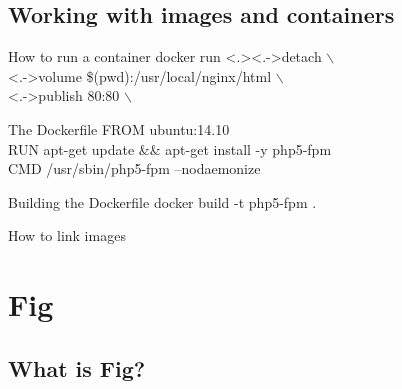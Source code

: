 \documentclass{beamer}
\begin{document}
    \subsection{Working with images and containers}
    \begin{frame}{How to run a container}
        \alert<+>{docker run}
        \alert<.>{\only<.->{\textendash\textendash detach $\backslash$\\}}
        \alert<+>{\only<.->{\textendash\textendash volume \$(pwd):/usr/local/nginx/html $\backslash$\\}}
        \alert<+>{\only<.->{\textendash\textendash publish 80:80 $\backslash$\\}}
    \end{frame}
    \begin{frame}{The Dockerfile}
        \alert<+>{}
        \alert<+>{FROM ubuntu:14.10\\}
        \alert<+>{RUN apt-get update \&\& apt-get install -y php5-fpm\\}
        \alert<+>{CMD /usr/sbin/php5-fpm --nodaemonize\\}
    \end{frame}
    \begin{frame}{Building the Dockerfile}
        docker build -t php5-fpm .
    \end{frame}
    \begin{frame}{How to link images}
    \end{frame}
    \section{Fig}
    \subsection{What is Fig?}
    \begin{frame}{}
    \end{frame}
\end{document}
